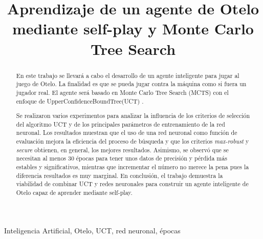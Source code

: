 \documentclass[conference,a4paper]{IEEEtran}
\begin{document}
\title{Aprendizaje de un agente de Otelo mediante self-play y Monte Carlo Tree Search}

\author{
  
  \and
  
}

\maketitle


\begin{abstract}
  En este trabajo se llevará a cabo el desarrollo de un agente inteligente para jugar al juego de Otelo. La finalidad es que se pueda jugar contra la máquina como si fuera un jugador real. El agente será basado en Monte Carlo Tree Search (MCTS) con el enfoque de UpperConfidenceBoundTree(UCT) \cite{b4}.

  Se realizaron varios experimentos para analizar la influencia de los criterios de selección del algoritmo UCT y de los principales parámetros de entrenamiento de la red neuronal. Los resultados muestran que el uso de una red neuronal como función de evaluación mejora la eficiencia del proceso de búsqueda y que los criterios \textit{max-robust} y \textit{secure} obtienen, en general, los mejores resultados. Asimismo, se observó que se necesitan al menos 30 épocas para tener unos datos de precisión y pérdida más estables y significativos, mientras que incrementar el número no merece la pena pues la diferencia resultados es muy marginal. En conclusión, el trabajo demuestra la viabilidad de combinar UCT y redes neuronales para construir un agente inteligente de Otelo capaz de aprender mediante self-play.
  
\end{abstract}


\begin{IEEEkeywords}
  Inteligencia Artificial, Otelo, UCT, red neuronal, épocas
\end{IEEEkeywords}
\end{document}

